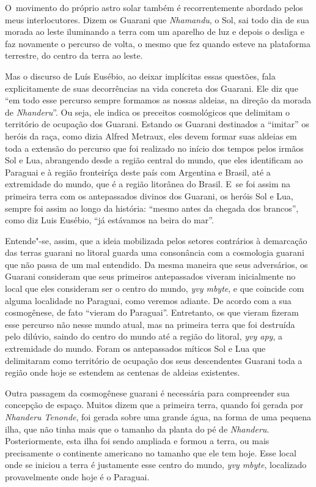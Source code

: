 O~movimento do próprio astro solar também é recorrentemente abordado
pelos meus interlocutores. Dizem os Guarani que \emph{Nhamandu}, o Sol, sai
todo dia de sua morada ao leste iluminando a terra com um aparelho de
luz e depois o desliga e faz novamente o percurso de volta, o mesmo que
fez quando esteve na plataforma terrestre, do centro da terra ao leste.

Mas o discurso de Luís Eusébio, ao deixar implícitas essas questões,
fala explicitamente de suas decorrências na vida concreta dos Guarani.
Ele diz que ``em todo esse percurso sempre formamos as nossas aldeias,
na direção da morada de \emph{Nhanderu}''. Ou seja, ele indica os preceitos
cosmológicos que delimitam o território de ocupação dos Guarani.
Estando os Guarani destinados a ``imitar'' os heróis da raça, como dizia
Alfred Metraux, eles devem formar suas aldeias em toda a extensão do
percurso que foi realizado no início dos tempos pelos irmãos Sol e Lua,
abrangendo desde a região central do mundo, que eles identificam ao
Paraguai e à região fronteiríça deste país com Argentina e Brasil, até
a extremidade do mundo, que é a região litorânea do Brasil. E~se foi
assim na primeira terra com os antepassados divinos dos Guarani, os
heróis Sol e Lua, sempre foi assim ao longo da história: ``mesmo antes
da chegada dos brancos'', como diz Luis Eusébio, ``já estávamos na beira
do mar''.

Entende"-se, assim, que a ideia mobilizada pelos setores contrários à
demarcação das terras guarani no litoral guarda uma consonância com a
cosmologia guarani que não passa de um mal entendido. Da mesma maneira
que seus adversários, os Guarani consideram que seus primeiros
antepassados viveram inicialmente no local que eles consideram ser o
centro do mundo, \emph{yvy mbyte}, e que coincide com alguma localidade no
Paraguai, como veremos adiante. De acordo com a sua cosmogênese, de
fato ``vieram do Paraguai''. Entretanto, os que vieram fizeram esse
percurso não nesse mundo atual, mas na primeira terra que foi destruída
pelo dilúvio, saindo do centro do mundo até a região do litoral, \emph{yvy
apy}, a extremidade do mundo. Foram os antepassados míticos Sol e Lua
que delimitaram como território de ocupação dos seus descendentes
Guarani toda a região onde hoje se estendem as centenas de aldeias
existentes.

Outra passagem da cosmogênese guarani é necessária para compreender sua
concepção de espaço. Muitos dizem que a primeira terra, quando foi
gerada por \emph{Nhanderu Tenonde}, foi gerada sobre uma grande água, na forma
de uma pequena ilha, que não tinha mais que o tamanho da planta do pé
de \emph{Nhanderu}. Posteriormente, esta ilha foi sendo ampliada e formou a
terra, ou mais precisamente o continente americano no tamanho que ele
tem hoje. Esse local onde se iniciou a terra é justamente esse centro
do mundo, \emph{yvy mbyte}, localizado provavelmente onde hoje é o Paraguai.

